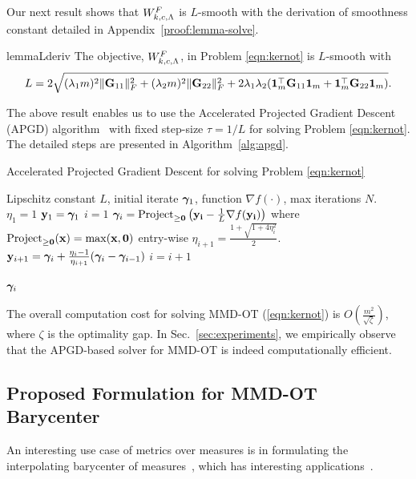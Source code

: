 Our next result shows that $W^F_{k, c, \Lambda}$ is $L$-smooth with the derivation of smoothness constant detailed in Appendix~\ref{proof:lemma-solve}. 
\begin{lemmaBox}
\begin{restatable}{lemma}{Lderiv}\label{apgd-L}
The objective, $W^F_{k, c, \Lambda}$, in Problem \ref{eqn:kernot} is $L$-smooth with     $$L= 2 \sqrt{(\lambda_1m)^2\|\mathbf{G}_{11}\|_F^2+(\lambda_2m)^2\|\mathbf{G}_{22}\|_F^2 + 2\lambda_1\lambda_2(\mathbf{1}_{m}^\top \mathbf{G}_{11}\mathbf{1}_{m}+ \mathbf{1}_{m}^\top \mathbf{G}_{22}\mathbf{1}_{m})}.$$
\end{restatable}
\end{lemmaBox}
The above result enables us to use the Accelerated Projected Gradient Descent (APGD) algorithm~\citep{nesterov2003introductory,beck09a} with fixed step-size $\tau=1/L$ for solving Problem \ref{eqn:kernot}. The detailed steps are presented in Algorithm~\ref{alg:apgd}.
\begin{algorithm}[t]
\caption[Accelerated Projected Gradient Descent for solving the proposed OT formulation with squared-MMD regularization.]{Accelerated Projected Gradient Descent for solving Problem \ref{eqn:kernot}}\label{alg:apgd}
\begin{algorithmic}[1]
\Require Lipschitz constant $L$, initial iterate $\bm{\gamma}_1$, function $\nabla f(\cdot)$, max iterations $N$.
\State $\eta_1=1$
\State $\mathbf{y}_1=\bm{\gamma}_1$
\State $i=1$
\State $\bm{\gamma}_{i} = \textup{Project}_{\mathbf{\geq 0}}\left(\mathbf{y_i} - \frac{1}{L} \nabla f(\mathbf{y_i})\right)$ where $\textup{Project}_{\mathbf{\geq 0}}(\mathbf{x})=\max(\mathbf{x}, \mathbf{0})$ entry-wise
\State $\eta_{i+1} = \frac{1+\sqrt{1+4\eta_{i}^2}}{2}$.
\State $\mathbf{y}_{i+1} = \bm{\gamma}_i + \frac{\eta_i-1}{\eta_{i+1}}(\bm{\gamma}_i - \bm{\gamma}_{i-1})$
\State $i=i+1$
\EndWhile
\end{algorithmic}
\Return $\bm{\gamma}_{i}$
\end{algorithm}
The overall computation cost for solving MMD-OT (\ref{eqn:kernot}) is ${O}(\frac{m^2}{\sqrt{\zeta}})$, where $\zeta$ is the optimality gap. In Sec.~\ref{sec:experiments}, we empirically observe that the APGD-based solver for MMD-OT is indeed computationally efficient.
\subsection{Proposed Formulation for MMD-OT Barycenter}\label{sec:bary}
An interesting use case of metrics over measures is in formulating the interpolating barycenter of measures~\citep{baryfirst}, which has interesting applications~\citep{pmlr-v32-solomon14,solobary15,GramfortPC15}. 

